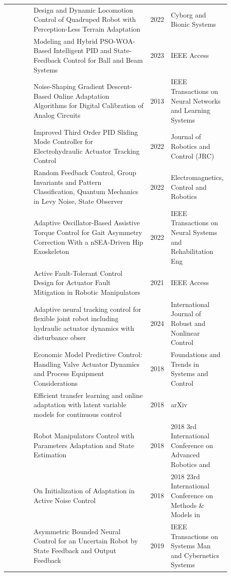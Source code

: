 \documentclass{article}
\begin{document}
\begin{center}
\begin{longtable}{p{0.12\linewidth}p{0.53\linewidth}p{0.08\linewidth}p{0.18\linewidth}}
\citep{pool86_33} & Design and Dynamic Locomotion Control of Quadruped Robot with Perception-Less Terrain Adaptation & 2022 & Cyborg and Bionic Systems\\
\citep{pool86_34} & Modeling and Hybrid PSO-WOA-Based Intelligent PID and State-Feedback Control for Ball and Beam Systems & 2023 & IEEE Access\\
\citep{pool86_35} & Noise-Shaping Gradient Descent-Based Online Adaptation Algorithms for Digital Calibration of Analog Circuits & 2013 & IEEE Transactions on Neural Networks and Learning Systems\\
\citep{pool86_36} & Improved Third Order PID Sliding Mode Controller for Electrohydraulic Actuator Tracking Control & 2022 & Journal of Robotics and Control (JRC)\\
\citep{pool86_37} & Random Feedback Control, Group Invariants and Pattern Classification, Quantum Mechanics in Levy Noise, State Observer  & 2022 & Electromagnetics, Control and Robotics\\
\citep{pool86_38} & Adaptive Oscillator-Based Assistive Torque Control for Gait Asymmetry Correction With a nSEA-Driven Hip Exoskeleton & 2022 & IEEE Transactions on Neural Systems and Rehabilitation Eng\\
\citep{pool86_39} & Active Fault-Tolerant Control Design for Actuator Fault Mitigation in Robotic Manipulators & 2021 & IEEE Access\\
\citep{pool86_40} & Adaptive neural tracking control for flexible joint robot including hydraulic actuator dynamics with disturbance obser & 2024 & International Journal of Robust and Nonlinear Control\\
\citep{pool86_41} & Economic Model Predictive Control: Handling Valve Actuator Dynamics and Process Equipment Considerations & 2018 & Foundations and Trends in Systems and Control\\
\citep{pool86_42} & Efficient transfer learning and online adaptation with latent variable models for continuous control & 2018 & arXiv\\
\citep{pool86_43} & Robot Manipulators Control with Parameters Adaptation and State Estimation & 2018 & 2018 3rd International Conference on Advanced Robotics and\\
\citep{pool86_44} & On Initialization of Adaptation in Active Noise Control & 2018 & 2018 23rd International Conference on Methods \& Models in\\
\citep{pool86_45} & Asymmetric Bounded Neural Control for an Uncertain Robot by State Feedback and Output Feedback & 2019 & IEEE Transactions on Systems Man and Cybernetics Systems\\

\end{longtable}
\end{center}
\end{document}
